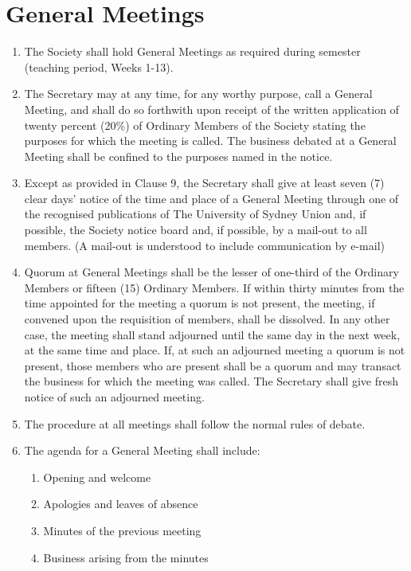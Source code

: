 \documentclass[11pt]{article}
\begin{document}
\section{General Meetings}
\begin{enumerate}[\thesection .1]
    \item The Society shall hold General Meetings as required during semester (teaching period, Weeks 1-13).
    \item The Secretary may at any time, for any worthy purpose, call a General Meeting, and shall do so forthwith upon receipt of the written application of twenty percent (20\%) of Ordinary Members of the Society stating the purposes for which the meeting is called. The business debated at a General Meeting shall be confined to the purposes named in the notice.
    \item Except as provided in Clause 9, the Secretary shall give at least seven (7) clear days’ notice of the time and place of a General Meeting through one of the recognised publications of The University of Sydney Union and, if possible, the Society notice board and, if possible, by a mail-out to all members. (A mail-out is understood to include communication by e-mail)
    \item Quorum at General Meetings shall be the lesser of one-third of the Ordinary Members or fifteen (15) Ordinary Members. If within thirty minutes from the time appointed for the meeting a quorum is not present, the meeting, if convened upon the requisition of members, shall be dissolved. In any other case, the meeting shall stand adjourned until the same day in the next week, at the same time and place. If, at such an adjourned meeting a quorum is not present, those members who are present shall be a quorum and may transact the business for which the meeting was called. The Secretary shall give fresh notice of such an adjourned meeting.
    \item The procedure at all meetings shall follow the normal rules of debate.
    \item The agenda for a General Meeting shall include:
    \begin{enumerate}[\hspace{5mm}1.]
        \item Opening and welcome
    	\item Apologies and leaves of absence
    	\item Minutes of the previous meeting
    	\item Business arising from the minutes

\end{enumerate}
\end{enumerate}
\end{document}
